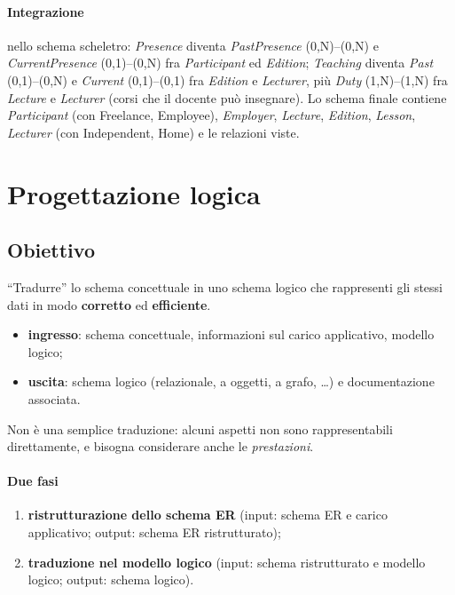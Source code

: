 \documentclass[a4paper,12pt]{article}
\begin{document}
\paragraph{Integrazione} nello schema scheletro: \emph{Presence} diventa
\emph{PastPresence} (0,N)--(0,N) e \emph{CurrentPresence} (0,1)--(0,N) fra
\emph{Participant} ed \emph{Edition}; \emph{Teaching} diventa \emph{Past}
(0,1)--(0,N) e \emph{Current} (0,1)--(0,1) fra \emph{Edition} e
\emph{Lecturer}, più \emph{Duty} (1,N)--(1,N) fra \emph{Lecture} e
\emph{Lecturer} (corsi che il docente può insegnare). Lo schema finale
contiene \emph{Participant} (con Freelance, Employee), \emph{Employer},
\emph{Lecture}, \emph{Edition}, \emph{Lesson}, \emph{Lecturer} (con
Independent, Home) e le relazioni viste.

\section{Progettazione logica}

\subsection{Obiettivo}

``Tradurre'' lo schema concettuale in uno schema logico che rappresenti gli
stessi dati in modo \textbf{corretto} ed \textbf{efficiente}.
\begin{itemize}
  \item \textbf{ingresso}: schema concettuale, informazioni sul carico
    applicativo, modello logico;
  \item \textbf{uscita}: schema logico (relazionale, a oggetti, a grafo,
    \dots) e documentazione associata.
\end{itemize}
Non è una semplice traduzione: alcuni aspetti non sono rappresentabili
direttamente, e bisogna considerare anche le \emph{prestazioni}.

\paragraph{Due fasi}
\begin{enumerate}
  \item \textbf{ristrutturazione dello schema ER} (input: schema ER e carico
    applicativo; output: schema ER ristrutturato);
  \item \textbf{traduzione nel modello logico} (input: schema ristrutturato e
    modello logico; output: schema logico).
\end{enumerate}
\end{document}
